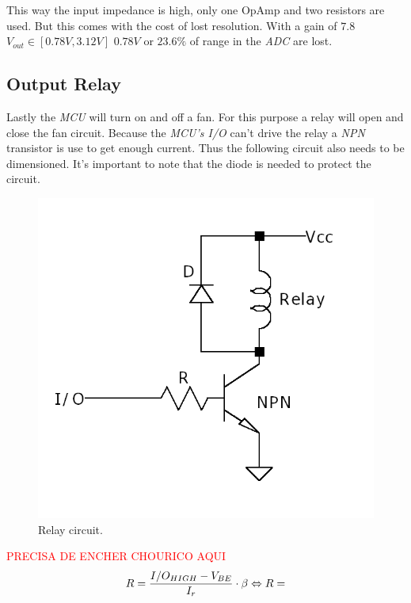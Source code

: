 \documentclass[12pt]{article}
\begin{document}
    This way the input impedance is high, only one OpAmp and two resistors are used.
    But this comes with the cost of lost resolution. With a gain of $7.8$ $V_{out}\in[0.78V,3.12V]$
    $0.78V$ or $23.6\%$ of range in the \textit{ADC} are lost.

\subsection{Output Relay }
    
    Lastly the \textit{MCU} will turn on and off a fan. For this purpose 
    a relay will open and close the fan circuit. Because the \textit{MCU's I/O} 
    can't drive the relay a \textit{NPN} transistor is use to get enough current.
    Thus the following circuit also needs to be dimensioned. It's important to note
    that the diode is needed to protect the circuit.
    
    \begin{figure}[H] 
        \centering
        \includegraphics*[scale = 0.4]{images/RelayDrive.png}
        \caption{Relay circuit.}
        \label{wrap-fig:1}
    \end{figure}
    \textcolor{red}{PRECISA DE ENCHER CHOURICO AQUI}
    \begin{equation}
        R = \frac{I/O_{HIGH}-V_{BE}}{I_r}\cdot \beta\\
        \Leftrightarrow R = 
    \end{equation}
\end{document}
